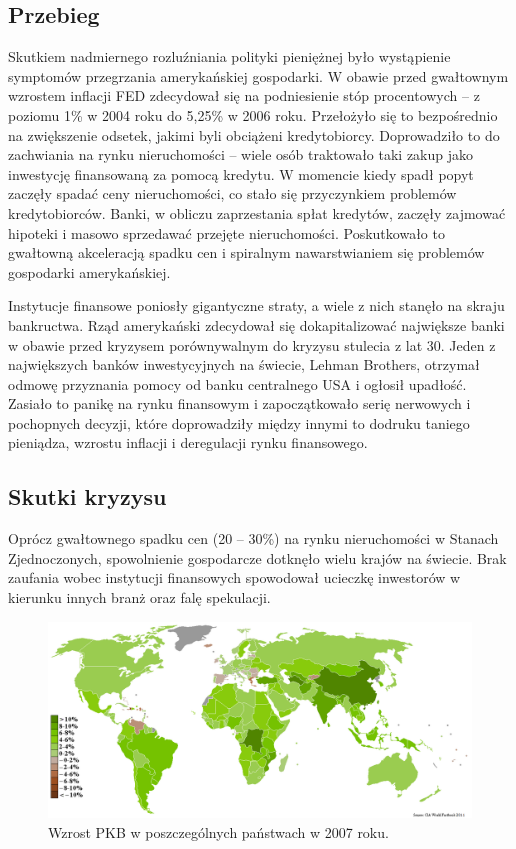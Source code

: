\subsection{Przebieg}

Skutkiem nadmiernego rozluźniania polityki pieniężnej było wystąpienie symptomów przegrzania amerykańskiej gospodarki. W obawie przed gwałtownym wzrostem inflacji FED zdecydował się na podniesienie stóp procentowych – z poziomu 1\% w 2004 roku do 5,25\% w 2006 roku. Przełożyło się to bezpośrednio na zwiększenie odsetek, jakimi byli obciążeni kredytobiorcy. Doprowadziło to do zachwiania na rynku nieruchomości – wiele osób traktowało taki zakup jako inwestycję finansowaną za pomocą kredytu. W momencie kiedy spadł popyt zaczęły spadać ceny nieruchomości, co stało się przyczynkiem problemów kredytobiorców. Banki, w obliczu zaprzestania spłat kredytów, zaczęły zajmować hipoteki i masowo sprzedawać przejęte nieruchomości. Poskutkowało to gwałtowną akceleracją spadku cen i spiralnym nawarstwianiem się problemów gospodarki amerykańskiej.

Instytucje finansowe poniosły gigantyczne straty, a wiele z nich stanęło na skraju bankructwa. Rząd amerykański zdecydował się dokapitalizować największe banki w obawie przed kryzysem porównywalnym do kryzysu stulecia z lat 30. Jeden z największych banków inwestycyjnych na świecie, Lehman Brothers, otrzymał odmowę przyznania pomocy od banku centralnego USA i ogłosił upadłość. Zasiało to panikę na rynku finansowym i zapoczątkowało serię nerwowych i pochopnych decyzji, które doprowadziły między innymi to dodruku taniego pieniądza, wzrostu inflacji i deregulacji rynku finansowego.

\subsection{Skutki kryzysu}

Oprócz gwałtownego spadku cen (20 – 30\%) na rynku nieruchomości w Stanach Zjednoczonych, spowolnienie gospodarcze dotknęło wielu krajów na świecie. Brak zaufania wobec instytucji finansowych spowodował ucieczkę inwestorów w kierunku innych branż oraz falę spekulacji.

\begin{figure}[h] \centering %
	\includegraphics{img/gdp_rate_2007.png}
	\caption{Wzrost PKB w poszczególnych państwach w 2007 roku.\cite{CIA}}
	\label{abcCode}
\end{figure}

